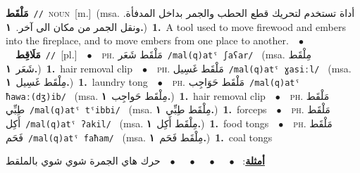 \documentclass[10pt,a4paper,twoside]{article} %
\begin{document}
\begin{multicols}{2}
{\setlength\topsep{0pt}\textbf{\foreignlanguage{arabic}{مَلْقَط}}\ {\color{gray}\texttt{//}\color{black}}\ \textsc{noun}\ [m.]\ \color{gray}(msa. \foreignlanguage{arabic}{أداة تستخدم لتحريك قطع الحطب والجمر بداخل المدفأة. ونقل الجمر من مكان الى آخر.}~\foreignlanguage{arabic}{\textbf{١.}})\color{black}\ \textbf{1.}~A tool used to move firewood and embers into the fireplace, and to move embers from one place to another.\ \ $\bullet$\ \ \setlength\topsep{0pt}\textbf{\foreignlanguage{arabic}{مَلَاقِط}}\ {\color{gray}\texttt{//}\color{black}}\ [pl.]\ \ $\bullet$\ \ \textsc{ph.} \color{gray} \foreignlanguage{arabic}{مَلْقَط شَعَر}\color{black}\ {\color{gray}\texttt{/{\sffamily mal(q)atˤ ʃaʕar}/}\color{black}}\ \color{gray} (msa. \foreignlanguage{arabic}{مِلْقَط شَعَر}~\foreignlanguage{arabic}{\textbf{١.}})\color{black}\ \textbf{1.}~hair removal clip\ \ $\bullet$\ \ \textsc{ph.} \color{gray} \foreignlanguage{arabic}{مَلْقَط غَسِيل}\color{black}\ {\color{gray}\texttt{/{\sffamily mal(q)atˤ ɣasiːl}/}\color{black}}\ \color{gray} (msa. \foreignlanguage{arabic}{مِلْقَط غَسِيل}~\foreignlanguage{arabic}{\textbf{١.}})\color{black}\ \textbf{1.}~laundry tong\ \ $\bullet$\ \ \textsc{ph.} \color{gray} \foreignlanguage{arabic}{مَلْقَط حَوَاجِب}\color{black}\ {\color{gray}\texttt{/{\sffamily mal(q)atˤ ħawaː(dʒ)ib}/}\color{black}}\ \color{gray} (msa. \foreignlanguage{arabic}{مِلْقَط حَواجِب}~\foreignlanguage{arabic}{\textbf{١.}})\color{black}\ \textbf{1.}~hair removal clip\ \ $\bullet$\ \ \textsc{ph.} \color{gray} \foreignlanguage{arabic}{مَلْقَط طِبِّي}\color{black}\ {\color{gray}\texttt{/{\sffamily mal(q)atˤ tˤibbi}/}\color{black}}\ \color{gray} (msa. \foreignlanguage{arabic}{مِلْقَط طِبِّي}~\foreignlanguage{arabic}{\textbf{١.}})\color{black}\ \textbf{1.}~forceps\ \ $\bullet$\ \ \textsc{ph.} \color{gray} \foreignlanguage{arabic}{مَلْقَط أَكِل}\color{black}\ {\color{gray}\texttt{/{\sffamily mal(q)atˤ ʔakil}/}\color{black}}\ \color{gray} (msa. \foreignlanguage{arabic}{مِلْقَط أَكِل}~\foreignlanguage{arabic}{\textbf{١.}})\color{black}\ \textbf{1.}~food tongs\ \ $\bullet$\ \ \textsc{ph.} \color{gray} \foreignlanguage{arabic}{مَلْقَط فَحَم}\color{black}\ {\color{gray}\texttt{/{\sffamily mal(q)atˤ faħam}/}\color{black}}\ \color{gray} (msa. \foreignlanguage{arabic}{مِلْقَط فَحَم}~\foreignlanguage{arabic}{\textbf{١.}})\color{black}\ \textbf{1.}~coal tongs\  \begin{flushright}\color{gray}\foreignlanguage{arabic}{\textbf{\underline{\foreignlanguage{arabic}{أمثلة}}}: \ $\bullet$\ \  \ $\bullet$\ \  \ $\bullet$\ \  \ $\bullet$\ \  حرك هاي الجمرة شوي شوي بالملقط}\end{flushright}\color{black}} \vspace{2mm}


\end{multicols}
\end{document}
